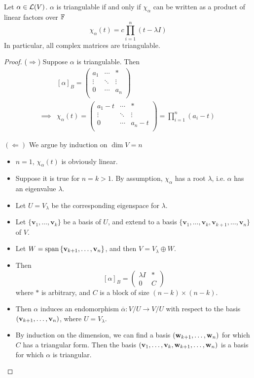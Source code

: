 \documentclass[a4paper,11pt]{article}
\begin{document}
\begin{theorem}\label{thm:test if triangulable}
	Let $ \alpha \in {\mathcal{L}}(V) $.
	$ \alpha $ is triangulable if and only if $ \chi_\alpha $ can be written as a product of linear factors over $ {\mathbb{F}} $ 
	\[
		\chi_\alpha(t) = c \prod_{i=1}^{n}(t-\lambda I)
	\]
	In particular, all complex matrices are triangulable.
\end{theorem}
\begin{proof}
	($\Rightarrow$) Suppose $\alpha$ is triangulable. Then 
	\begin{align*}
		& [\alpha]_B = \begin{pmatrix}
			a_1 & \cdots &  * \\
			\vdots  & \ddots  &  \vdots  \\
			0 & \cdots  &  a_n \\
		\end{pmatrix}\\ 
		\implies & \chi_\alpha(t) = \begin{pmatrix}
			a_1-t & \cdots &  * \\
			\vdots  & \ddots  &  \vdots  \\
			0 & \cdots  &  a_n-t \\
		\end{pmatrix} = \prod_{i=1}^{n} (a_i - t)
	\end{align*}

	$(\Leftarrow)$ We argue by induction on $ \dim V = n $ 
	\begin{itemize}
		\item $n=1$, $ \chi_\alpha(t) $ is obviously linear.
		\item Suppose it is true for $n=k>1$. By assumption, $ \chi_\alpha $ has a root $ \lambda $, i.e. $\alpha$ has an eigenvalue $\lambda$. 
		\item Let $U = V_\lambda$ be the corresponding eigenspace for $\lambda$. 
		\item Let $ \{\mathbf{v}_1,\dots,\mathbf{v}_k\} $ be a basis of $U$, and extend to a basis $ \{\mathbf{v}_1,\dots,\mathbf{v}_k,\mathbf{v}_{k+1},\dots,\mathbf{v}_n\} $ of $V$. 
		\item Let $ W = \operatorname{span}\qty{{\bf v}_{k+1}, \dots, {\bf v}_n} $, and then $ V = V_\lambda \oplus W $.
		\item Then
		\[
			[\alpha]_B = \begin{pmatrix}
				\lambda I & * \\
				0         & C
			\end{pmatrix}
		\]
		where $ * $ is arbitrary, and $ C $ is a block of size $ (n-k) \times (n-k) $.
		\item Then $ \alpha $ induces an endomorphism $ \overline \alpha \colon V/U \to V/U $ with respect to the basis $ ({\bf v}_{k+1}, \dots, {\bf v}_n) $, where $ U = V_\lambda $.
		\item By induction on the dimension, we can find a basis $ ({\bf w}_{k+1}, \dots, {\bf w}_n) $ for which $ C $ has a triangular form.
		Then the basis $ ({\bf v}_1, \dots, \mathbf{v}_k, {\bf w}_{k+1}, \dots, {\bf w}_n) $ is a basis for which $ \alpha $ is triangular.
	\end{itemize}
\end{proof}
\end{document}
